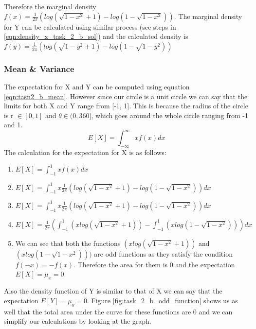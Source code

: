 Therefore the marginal density $f(x) = \frac{1}{2\pi} (log(\sqrt{1-x^2}+1)- log(1-\sqrt{1-x^2}))$. The marginal density for Y can be calculated using similar process (see steps in \ref{eqn:density_x_task_2_b_sol}) and the calculated density is $f(y) =  \frac{1}{2\pi} (log(\sqrt{1-y^2}+1)- log(1-\sqrt{1-y^2}))$

\subsubsection{ Mean \& Variance }
The expectation for X and Y can be computed using equation \ref{eqn:tasn2_b_mean}. However since our circle is a unit circle we can say that the limits for both X and Y range from [-1, 1]. This is because the radius of the circle is r $\in [0, 1]$ and $\theta \in (0, 360]$, which goes around the whole circle ranging from -1 and 1.
\begin{equation} \label{eqn:tasn2_b_mean}
    E[X] = \int_{-\infty}^{\infty}xf(x) dx
\end{equation}
The calculation for the expectation for X is as follows:
\begin{enumerate}
    \item $E[X] = \int_{-1}^{1}xf(x) dx$
    \item $E[X] = \int_{-1}^{1}x\frac{1}{2\pi} (log(\sqrt{1-x^2}+1)- log(1-\sqrt{1-x^2})) dx$
    \item $E[X] = \int_{-1}^{1}x\frac{1}{2\pi} (log(\sqrt{1-x^2}+1)- log(1-\sqrt{1-x^2})) dx$
    \item $E[X] = \frac{1}{2\pi} (\int_{-1}^{1}(x log(\sqrt{1-x^2}+1))- \int_{-1}^{1}(x log(1-\sqrt{1-x^2}))) dx$
    \item We can see that both the functions $(x log(\sqrt{1-x^2}+1))$ and $(x log(1-\sqrt{1-x^2})))$ are odd functions as they satisfy the condition $f(-x) = -f(x)$. Therefore the area for them is 0 and the expectation $E[X]=\mu_x = 0$
\end{enumerate}
Also the density function of Y is similar to that of X we can say that the expectation $E[Y]=\mu_y = 0$. Figure \ref{fig:task_2_b_odd_function} shows us as well that the total area under the curve for these functions are 0 and we can simplify our calculations by looking at the graph.

